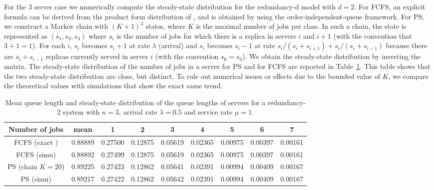 \documentclass[acmsmall,nonacm]{acmart}
\begin{document}
For the $3$ server case we numerically compute the steady-state distribution for the redundancy-d model with $d=2$. For FCFS, an explicit formula can be derived from the product form distribution of \cite{gardner2017redundancy}, and is obtained by using the order-independent-queue framework. For PS, we construct a Markov chain with $(K+1)^3$ states, where $K$ is the maximal number of jobs per class. In such a chain, the state is represented as $(s_1,s_2,s_3)$ where $s_i$ is the number of jobs for which there is a replica in servers $i$ and $i+1$ (with the convention that $3+1=1$).  For each $i$, $s_i$ becomes $s_i+1$ at rate $\lambda$ (arrival) and $s_i$ becomes $s_i-1$ at rate $s_i/(s_i+s_{i+1})+s_i/(s_i+s_{i-1})$ because there are $s_i+s_{i-1}$ replicas currently served in server $i$ (with the convention $s_0=s_3$).  We obtain the steady-state distribution by inverting the matrix. %
The steady-state distribution of the number of jobs in a server for PS and for FCFS are reported in Table~\ref{tab:steady-state}.  This table shows that the two steady-state distribution are close, but distinct.  To rule out numerical issues or effects due to the bounded value of $K$, we compare the theoretical values with simulations that show the exact same trend. %


\begin{table}[t]
    \begin{tabular}{|c|c|c|c|c|c|c|c|c|}
        \hline
        Number of jobs & mean & 1 & 2 & 3 & 4 & 5 & 6& 7\\
        \hline
        FCFS (exact \cite{gardner2017redundancy}) & 0.88889 & 0.27500 & 0.12875 & 0.05619 & 0.02365 & 0.00975 & 0.00397 & 0.00161 \\
        FCFS (simu) & 0.88892 & 0.27499 & 0.12875 & 0.05619 & 0.02365 & 0.00975 & 0.00397 & 0.00161 \\\hline
        PS (chain $K{=}20$) & 0.89225 & 0.27423 & 0.12862 & 0.05641 & 0.02391 & 0.00994 & 0.00409 & 0.00167 \\
        PS (simu) & 0.89217 & 0.27422 & 0.12862 & 0.05642 & 0.02391 & 0.00994 & 0.00409 & 0.00167 \\\hline
    \end{tabular}
    \caption{Mean queue length and steady-state distribution of the queue lengths of servers for a redundancy-2 system with $n=3$, arrival rate $\lambda=0.5$ and service rate $\mu=1$.}
    \label{tab:steady-state}
\end{table}
\end{document}
